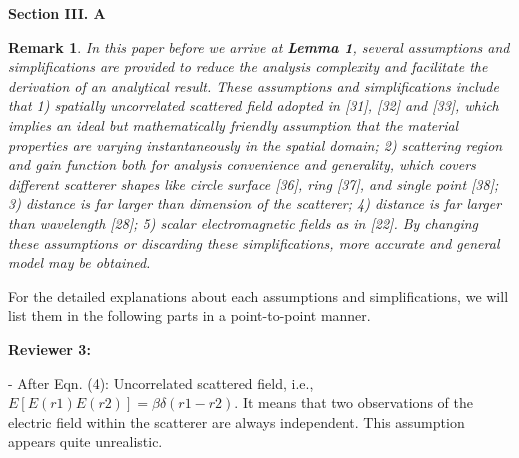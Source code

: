 \documentclass[a4paper,12pt]{article}
\newtheorem{remark}{\bf Remark}
\begin{document}
\begin{framed}
	{\bf Section III. A}

    {\color{red}
\begin{remark}
    \quad In this paper before we arrive at {\bf Lemma 1}, several assumptions and simplifications are provided to reduce the analysis complexity and facilitate the derivation of an analytical result. These assumptions and simplifications include that 1) spatially uncorrelated scattered field adopted in [31], [32] and [33], which implies an ideal but mathematically friendly assumption that the material properties are varying instantaneously in the spatial domain; 2) scattering region and gain function both for analysis convenience and generality, which covers different scatterer shapes like circle surface [36], ring [37], and single point [38]; 3) distance is far larger than dimension of the scatterer; 4) distance is far larger than wavelength [28]; 5) scalar electromagnetic fields as in [22]. By changing these assumptions or discarding these simplifications, more accurate and general model may be obtained. 
	\end{remark}}

\end{framed}

{{\color{blue}For the detailed explanations about each assumptions and simplifications, we will list them in the following parts in a point-to-point manner.
}}

\textbf{Reviewer 3:}

-   After Eqn. (4): Uncorrelated scattered field, i.e., $E[E(r1)E(r2)] = \beta \delta(r1-r2)$. It means that two observations of the electric field within the scatterer are always independent. This assumption appears quite unrealistic.

{}
\end{document}
